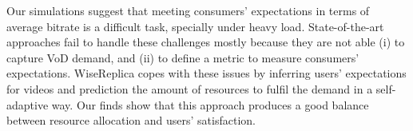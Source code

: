 Our simulations suggest that meeting consumers' expectations in terms of average bitrate is a difficult task, specially under heavy load. State-of-the-art approaches fail to handle these challenges mostly because they are not able (i) to capture VoD demand, and (ii) to define a metric to measure consumers' expectations. WiseReplica copes with these issues by inferring users' expectations for videos and prediction the amount of resources to fulfil the demand in a self-adaptive way. Our finds show that this approach produces a good balance between resource allocation and users' satisfaction.

